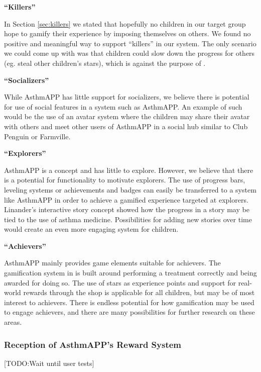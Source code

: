 \textbf{``Killers''}

In Section \ref{sec:killers} we stated that hopefully no children in our target group hope to gamify their experience by imposing themselves on others. We found no positive and meaningful way to support ``killers'' in our system. The only scenario we could come up with was that children could slow down the progress for others (eg. steal other children's stars), which is against the purpose of \app{}.  

\textbf{``Socializers''}

While AsthmAPP has little support for socializers, we believe there is potential for use of social features in a system such as AsthmAPP. An example of such would be the use of an avatar system where the children may share their avatar with others and meet other users of AsthmAPP in a social hub similar to Club Penguin or Farmville. 


\textbf{``Explorers''}

AsthmAPP is a concept and has little to explore. However, we believe that there is a potential for functionality to motivate explorers. The use of progress bars, leveling systems or achievements and badges can easily be transferred to a system like AsthmAPP in order to achieve a gamified experience targeted at explorers. Linander's interactive story concept showed how the progress in a story may be tied to the use of asthma medicine\cite{linander2013utvikling}. Possibilities for adding new stories over time would create an even more engaging system for children. 

\textbf{``Achievers''}

AsthmAPP mainly provides game elements suitable for achievers. The gamification system in \app{} is built around performing a treatment correctly and being awarded for doing so. The use of stars as experience points and support for real-world rewards through the shop is applicable for all children, but may be of most interest to achievers. There is endless potential for how gamification may be used to engage achievers, and there are many possibilities for further research on these areas. 


\subsubsection{Reception of AsthmAPP's Reward System}
\label{sec:receptionofrewardsystem}
[TODO:Wait until user tests]


